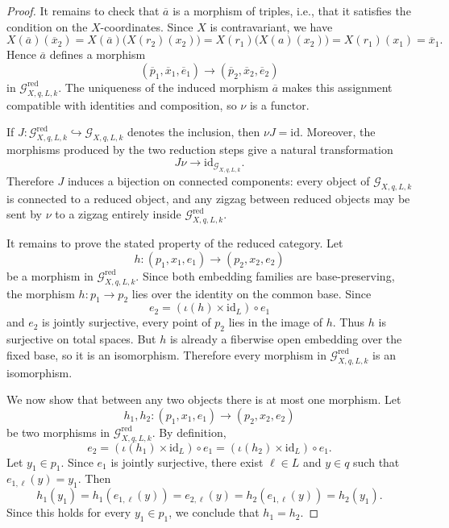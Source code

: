 \documentclass[10pt,a4paper]{amsart}
\newcommand{\id}{\mathrm{id}}
\begin{document}
\begin{proof}
  It remains to check that \(\overline{a}\) is a morphism of triples, i.e., that
  it
  satisfies the condition on the \(X\)-coordinates. Since \(X\) is
  contravariant, we have
  \[
    X(\overline{a})(\overline{x}_2)
    =
    X(\overline{a})\bigl(X(r_2)(x_2)\bigr)
    =
    X(r_1)\bigl(X(a)(x_2)\bigr)
    =
    X(r_1)(x_1)
    =
    \overline{x}_1.
  \]
  Hence \(\overline{a}\) defines a morphism
  \[
    (\overline{p}_1,\overline{x}_1,\overline{e}_1)
    \longrightarrow
    (\overline{p}_2,\overline{x}_2,\overline{e}_2)
  \]
  in \(\mathcal{G}^{\mathrm{red}}_{X,q,L,k}\). The uniqueness of the induced
  morphism \(\overline{a}\) makes this assignment
  compatible with identities and composition, so \(\nu\) is a functor.

  If \(J:\mathcal{G}^{\mathrm{red}}_{X,q,L,k}\hookrightarrow
  \mathcal{G}_{X,q,L,k}\) denotes the inclusion, then \(\nu J=\id\). Moreover,
  the morphisms produced by the two reduction steps give a natural
  transformation
  \[
    J\nu\longrightarrow \id_{\mathcal{G}_{X,q,L,k}}.
  \]
  Therefore \(J\) induces a bijection on connected components: every object of
  \(\mathcal{G}_{X,q,L,k}\) is connected to a reduced object, and any zigzag
  between reduced objects may be sent by \(\nu\) to a zigzag entirely inside
  \(\mathcal{G}^{\mathrm{red}}_{X,q,L,k}\).

  It remains to prove the stated property of the reduced category. Let
  \[
    h:(p_1,x_1,e_1)\longrightarrow (p_2,x_2,e_2)
  \]
  be a morphism in \(\mathcal{G}^{\mathrm{red}}_{X,q,L,k}\). Since both
  embedding families are base-preserving, the morphism \(h:p_1\to p_2\) lies
  over the identity on the common base. Since
  \[
    e_2=(\iota(h)\times \id_L)\circ e_1
  \]
  and \(e_2\) is jointly surjective, every point of \(p_2\) lies in the image
  of \(h\). Thus \(h\) is surjective on total spaces. But \(h\) is already a
  fiberwise open embedding over the fixed base, so it is an isomorphism.
  Therefore every morphism in
  \(\mathcal{G}^{\mathrm{red}}_{X,q,L,k}\) is an isomorphism.

  We now show that between any two objects there is at most one morphism. Let
  \[
    h_1,h_2:(p_1,x_1,e_1)\longrightarrow (p_2,x_2,e_2)
  \]
  be two morphisms in \(\mathcal{G}^{\mathrm{red}}_{X,q,L,k}\). By definition,
  \[
    e_2=(\iota(h_1)\times \id_L)\circ e_1
    =(\iota(h_2)\times \id_L)\circ e_1.
  \]
  Let \(y_1\in p_1\). Since \(e_1\) is jointly surjective, there exist
  \(\ell\in L\) and \(y\in q\) such that \(e_{1,\ell}(y)=y_1\). Then
  \[
    h_1(y_1)
    =h_1(e_{1,\ell}(y))
    =e_{2,\ell}(y)
    =h_2(e_{1,\ell}(y))
    =h_2(y_1).
  \]
  Since this holds for every \(y_1\in p_1\), we conclude that \(h_1=h_2\).


\end{proof}
\end{document}
